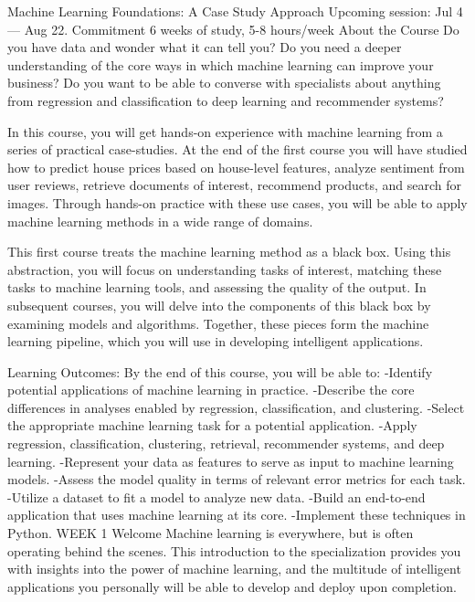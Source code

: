 Machine Learning Foundations: A Case Study Approach
Upcoming session: Jul 4 — Aug 22.
Commitment
6 weeks of study, 5-8 hours/week
About the Course
Do you have data and wonder what it can tell you?  Do you need a deeper understanding of the core ways in which machine learning can improve your business?  Do you want to be able to converse with specialists about anything from regression and classification to deep learning and recommender systems?

In this course, you will get hands-on experience with machine learning from a series of practical case-studies.  At the end of the first course you will have studied how to predict house prices based on house-level features, analyze sentiment from user reviews, retrieve documents of interest, recommend products, and search for images.  Through hands-on practice with these use cases, you will be able to apply machine learning methods in a wide range of domains.

This first course treats the machine learning method as a black box.  Using this abstraction, you will focus on understanding tasks of interest, matching these tasks to machine learning tools, and assessing the quality of the output. In subsequent courses, you will delve into the components of this black box by examining models and algorithms.  Together, these pieces form the machine learning pipeline, which you will use in developing intelligent applications.

Learning Outcomes:  By the end of this course, you will be able to:
   -Identify potential applications of machine learning in practice.  
   -Describe the core differences in analyses enabled by regression, classification, and clustering.
   -Select the appropriate machine learning task for a potential application.  
   -Apply regression, classification, clustering, retrieval, recommender systems, and deep learning.
   -Represent your data as features to serve as input to machine learning models. 
   -Assess the model quality in terms of relevant error metrics for each task.
   -Utilize a dataset to fit a model to analyze new data.
   -Build an end-to-end application that uses machine learning at its core.  
   -Implement these techniques in Python.
WEEK 1
Welcome
Machine learning is everywhere, but is often operating behind the scenes.
This introduction to the specialization provides you with insights into the power of machine learning, and the multitude of intelligent applications you personally will be able to develop and deploy upon completion.

